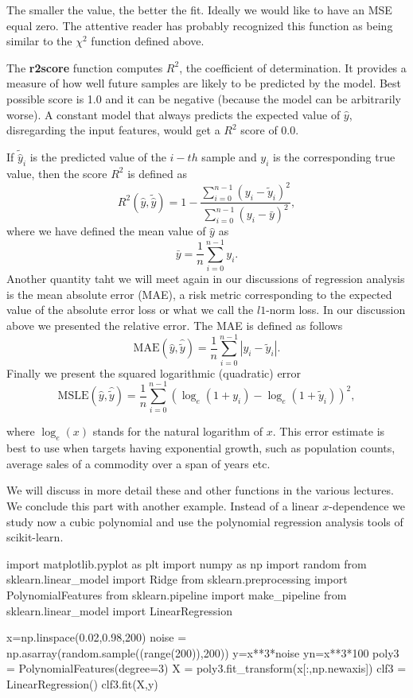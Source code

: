 \documentclass[%
oneside,                 %
final,                   %
10pt]{article}
\begin{document}
The smaller the value, the better the fit. Ideally we would like to
have an MSE equal zero.  The attentive reader has probably recognized
this function as being similar to the $\chi^2$ function defined above.

The \textbf{r2score} function computes $R^2$, the coefficient of
determination. It provides a measure of how well future samples are
likely to be predicted by the model. Best possible score is 1.0 and it
can be negative (because the model can be arbitrarily worse). A
constant model that always predicts the expected value of $\hat{y}$,
disregarding the input features, would get a $R^2$ score of $0.0$.

If $\tilde{\hat{y}}_i$ is the predicted value of the $i-th$ sample and $y_i$ is the corresponding true value, then the score $R^2$ is defined as
\[
R^2(\hat{y}, \tilde{\hat{y}}) = 1 - \frac{\sum_{i=0}^{n - 1} (y_i - \tilde{y}_i)^2}{\sum_{i=0}^{n - 1} (y_i - \bar{y})^2},
\]
where we have defined the mean value  of $\hat{y}$ as
\[
\bar{y} =  \frac{1}{n} \sum_{i=0}^{n - 1} y_i.
\]
Another quantity taht we will meet again in our discussions of regression analysis is 
 the mean absolute error (MAE), a risk metric corresponding to the expected value of the absolute error loss or what we call the $l1$-norm loss. In our discussion above we presented the relative error.
The MAE is defined as follows
\[
\text{MAE}(\hat{y}, \hat{\tilde{y}}) = \frac{1}{n} \sum_{i=0}^{n-1} \left| y_i - \tilde{y}_i \right|.
\]
Finally we present the 
squared logarithmic (quadratic) error
\[
\text{MSLE}(\hat{y}, \hat{\tilde{y}}) = \frac{1}{n} \sum_{i=0}^{n - 1} (\log_e (1 + y_i) - \log_e (1 + \tilde{y}_i) )^2,
\]

where $\log_e (x)$ stands for the natural logarithm of $x$. This error
estimate is best to use when targets having exponential growth, such
as population counts, average sales of a commodity over a span of
years etc. 

We will discuss in more
detail these and other functions in the various lectures.  We conclude this part with another example. Instead of 
a linear $x$-dependence we study now a cubic polynomial and use the polynomial regression analysis tools of scikit-learn. 

\bpycod
import matplotlib.pyplot as plt
import numpy as np
import random
from sklearn.linear_model import Ridge
from sklearn.preprocessing import PolynomialFeatures
from sklearn.pipeline import make_pipeline
from sklearn.linear_model import LinearRegression

x=np.linspace(0.02,0.98,200)
noise = np.asarray(random.sample((range(200)),200))
y=x**3*noise
yn=x**3*100
poly3 = PolynomialFeatures(degree=3)
X = poly3.fit_transform(x[:,np.newaxis])
clf3 = LinearRegression()
clf3.fit(X,y)
\end{document}
